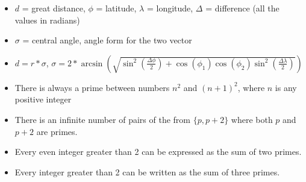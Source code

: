 \begin{itemize}
\item $d$ = great distance, $\phi$ = latitude, $\lambda$ = longitude, $\Delta$ = difference (all the values in radians)
\item $\sigma$ = central angle, angle form for the two vector
\item $d = r * \sigma$, $\sigma = 2 * \arcsin(\sqrt{\sin^2(\frac{\Delta\phi}{2}) + \cos(\phi_1)\cos(\phi_2)\sin^2(\frac{\Delta\lambda}{2})})$
\end{itemize}
\begin{itemize}
\item There is always a prime between numbers $n^2$ and $(n+1)^2$, where $n$ is any positive integer
\item There is an infinite number of pairs of the from $\{p, p + 2\}$ where both $p$ and $p + 2$ are primes.
\item Every even integer greater than 2 can be expressed as the sum of two primes.
\item Every integer greater than 2 can be written as the sum of three primes.
\end{itemize}

